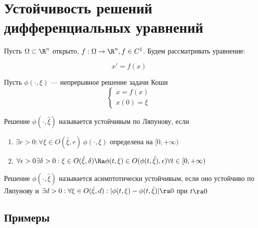 
\section{Устойчивость решений дифференциальных уравнений}
Пусть \(\Omega \subset \R^n\) открыто, \(f: \Omega \to \R^n, f \in C^1\). Будем рассматривать уравнение:

\begin{equation}
    x' = f(x)
\end{equation}

Пусть \(\phi(\cdot, \xi)\) --- непрерывное решение задачи Коши
\begin{equation*}
    \begin{cases}
        \dot{x} = f(x) \\
        x(0) = \xi
    \end{cases}
\end{equation*}

\begin{definition}
    Решение \(\phi(\cdot, \hat{\xi})\) называется устойчивым по Ляпунову, если 
    \begin{enumerate}
        \item \(\exists r > 0: \forall \xi \in O(\hat{\xi}, r) \ \phi(\cdot, \xi) \) определена на \([0, +\infty)\)
        \item \(\forall \epsilon > 0 \exists \delta > 0: \xi \in O(\hat{\xi}, \delta) \Ra \phi(t, \xi) \in O(\phi(t, \hat{\xi}), \epsilon) \forall t \in [0, +\infty)\)
    \end{enumerate}
\end{definition}

\begin{definition}
    Решение \(\phi(\cdot, \hat{\xi})\) называется асимптотически устойчивым, если оно устойчиво по Ляпунову и \(\exists d > 0: \forall \xi \in O(\hat{\xi}, d): |\phi(t, \xi) - \phi(t, \hat{\xi})| \ra 0\) при \(t \ra 0\)
\end{definition}

\subsection{Примеры}

